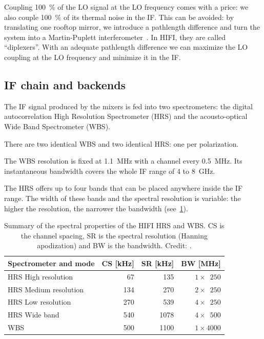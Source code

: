 Coupling \SI{100}{\percent} of the LO signal at the LO frequency comes with a price: we also couple \SI{100}{\percent} of its thermal noise in the IF.
This can be avoided: by translating one rooftop mirror, we introduce a pathlength difference and turn the system into a Martin-Puplett interferometer~\autocite{martin1982polarizing}.
In HIFI, they are called ``diplexers''.
With an adequate pathlength difference we can maximize the LO coupling at the LO frequency and minimize it in the IF.




\subsection{IF chain and backends}

The IF signal produced by the mixers is fed into two spectrometers:
the digital autocorrelation High Resolution Spectrometer (HRS) and
the acousto-optical Wide Band Spectrometer (WBS).

There are two identical WBS and two identical HRS: one per polarization.

The WBS resolution is fixed at \SI{1.1}{\mega\hertz} with a channel every \SI{0.5}{\mega\hertz}.
Its instantaneous bandwidth covers the whole IF range of 4 to \SI{8}{\giga\hertz}.

The HRS offers up to four bands that can be placed anywhere inside the IF range.
The width of these bands and the spectral resolution is variable: the higher the resolution, the narrower the bandwidth (see~\cref{tab:wbs_hrs}).

\begin{table}[hb]
    \centering
    \begin{tabular}{lrrr}
    \toprule
    Spectrometer and mode & 
    CS [\si{\kilo\hertz}]
    &
    SR [\si{\kilo\hertz}]
    &
    BW [\si{\mega\hertz}]\\
    \midrule
    HRS High resolution   &  67 &  135 & $1 \times \phantom{0}250$\\
    HRS Medium resolution & 134 &  270 & $2 \times \phantom{0}250$\\
    HRS Low resolution    & 270 &  539 & $4 \times \phantom{0}250$\\
    HRS Wide band         & 540 & 1078 & $4 \times \phantom{0}500$\\
    \midrule
    WBS                   & 500 & 1100 & $1 \times 4000$\\
    \bottomrule
    \end{tabular}
    \caption{
        Summary of the spectral properties of the HIFI HRS and WBS.
        CS is the channel spacing,
        SR is the spectral resolution (Hanning apodization) and
        BW is the bandwidth.
        Credit: \textcite{belgacem2004high}.
    }
    \label{tab:wbs_hrs}
\end{table}


